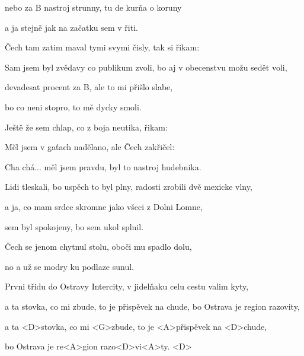 nebo za B nastroj strunny, tu de kurňa o koruny

a ja stejně jak na začatku sem v řiti.
\ks

\zs
Čech tam zatim maval tymi svymi čisly, tak si řikam: 
\ks

\zs
Sam jsem byl zvědavy co publikum zvoli, bo aj v obecenstvu možu sedět voli,

devadesat procent za B, ale to mi přišlo slabe,

bo co neni stopro, to mě dycky smoli.
\ks

\zs
Ještě že sem chlap, co z boja neutika, řikam: 

Měl jsem v gaťach nadělano, ale Čech zakřičel: 

Cha chá... měl jsem pravdu, byl to nastroj hudebnika.
\ks

\zs
Lidi tleskali, bo uspěch to byl plny, radosti zrobili dvě mexicke vlny,

a ja, co mam srdce skromne jako všeci z Dolni Lomne,

sem byl spokojeny, bo sem ukol splnil.
\ks

\zs
{}

Čech se jenom chytnul stolu, oboči mu spadlo dolu,

no a už se modry ku podlaze sunul.
\ks

\zs
Prvni třidu do Ostravy Intercity, v jidelňaku celu cestu valim kyty,

a ta stovka, co mi zbude, to je přispěvek na chude, bo Ostrava je region razovity,

a ta <D>stovka, co mi <G>zbude, to je <A>přispěvek na <D>chude,

bo Ostrava je re<A>gion razo<D>vi<A>ty. <D>
\ks

\kp
